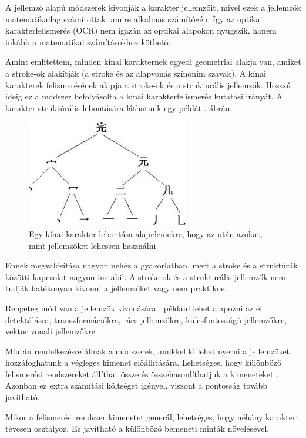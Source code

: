 A jellemző alapú módszerek \cite{bunke1997handbook} kivonják a karakter jellemzőit, mivel ezek a jellemzők matematikailag számítottak, amire alkalmas számítógép. Így az optikai karakterfelismerés (OCR) nem igazán az optikai alapokon nyugszik, hanem inkább a matematikai számításokhoz köthető.

Amint említettem, minden kínai karakternek egyedi geometriai alakja van, amiket a stroke-ok alakítják (a stroke és az alapvonás színonim szavak). A kínai karakterek felismerésének alapja a stroke-ok és a strukturális jellemzők. Hosszú ideig ez a módszer befolyásolta a kínai karakterfelismerés kutatási irányát.
A karakter struktúrális lebontására láthatunk egy példát . ábrán.

\begin{figure}[h]
\centering
\includegraphics[scale=0.8]{images/ocr_features}
\caption{Egy kínai karakter lebontása alapelemekre, hogy az után azokat, mint jellemzőket lehessen használni}
\label{fig:ocr_features}
\end{figure}

Ennek megvalósítása nagyon nehéz a gyakorlatban, mert a stroke és a struktúrák közötti kapcsolat nagyon instabil. A stroke-ok és a strukturális jellemzők nem tudják hatékonyan kivonni a jellemzőket vagy nem praktikus.

Rengeteg mód van a jellemzők kivonására \cite{bunke1997handbook}, például lehet alapozni az él detektálásra, transzformációkra, rács jellemzőkre, kulcsfontosságú jellemzőkre, vektor vonali jellemzőkre.

Miután rendelkezésre állnak a módszerek, amikkel ki lehet nyerni a jellemzőket, hozzáfoghatunk a végleges kimenet előállítására. Lehetséges, hogy különböző felismerési rendszereket állíthat össze és összehasonlíthatjuk a kimeneteket \cite{liu2013online} \cite{dong2005improved} \cite{zhong2015high}. Azonban ez extra számítási költséget igényel, viszont a pontosság tovább javítható.

Mikor a felismerési rendszer kimenetet generál, lehetséges, hogy néhány karaktert tévesen osztályoz. Ez javítható a különböző bemeneti minták növelésével.

